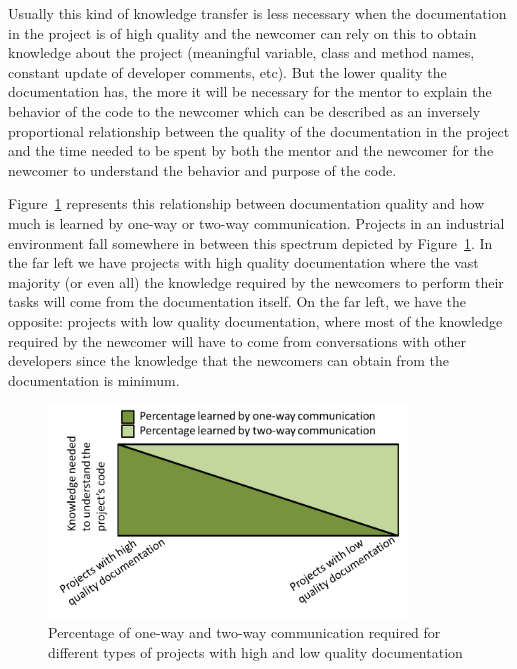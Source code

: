 \documentclass[12pt, letterpaper]{article}
\begin{document}
Usually this kind of knowledge transfer is less necessary when the documentation in the project is of high
quality and the newcomer can rely on this to obtain knowledge about the project (meaningful variable, class and 
method names, constant update of developer comments, etc). But the lower quality the documentation has, the more
it will be necessary for the mentor to explain the behavior of the code to the newcomer which can be described
as an inversely proportional relationship between the quality of the documentation in the project and the 
time needed to be spent by both the mentor and the newcomer for the newcomer to understand the behavior and
purpose of the code. 

Figure~\ref{graph1} represents this relationship between documentation quality and how much is learned by
one-way or two-way communication. Projects in an industrial environment fall somewhere in between this spectrum 
depicted by Figure~\ref{graph1}. In the far left we have projects with high quality documentation where the vast
majority (or even all) the knowledge required by the newcomers to perform their tasks will come from the 
documentation itself. On the far left, we have the opposite: projects with low quality documentation, where most 
of the knowledge required by the newcomer will have to come from conversations with other developers since
the knowledge that the newcomers can obtain from the documentation is minimum.


\begin{figure}[h]
    \centering
    \includegraphics[width=0.85\textwidth]{Graph1}
    \caption{Percentage of one-way and two-way communication required for different types of projects with high and low quality documentation}
    \label{graph1}
\end{figure}
\end{document}
